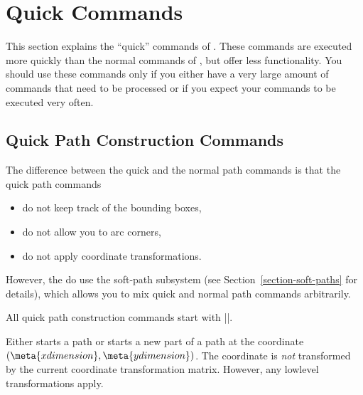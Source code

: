 %


\section{Quick Commands}

This section explains the ``quick'' commands of \pgfname. These
commands are executed more quickly than the normal commands of
\pgfname, but offer less functionality. You should use these commands
only if you either have a very large amount of commands that need to
be processed or if you expect your commands to be executed very often.



\subsection{Quick Path Construction Commands}

The difference between the quick and the normal path commands is that
the quick path commands
\begin{itemize}
\item
  do not keep track of the bounding boxes,
\item
  do not allow you to arc corners,
\item
  do not apply coordinate transformations.
\end{itemize}

However, the do use the soft-path subsystem (see
Section~\ref{section-soft-paths} for details), which allows you to mix
quick and normal path commands arbitrarily.

All quick path construction commands start with |\pgfpathq|.

\begin{command}{\pgfpathqmoveto{}}
  Either starts a path or starts a new part of a path at the coordinate
  $(\meta{x dimension},\meta{y dimension})$. The coordinate is
  \emph{not} transformed by the current coordinate transformation
  matrix. However, any lowlevel transformations apply.

\begin{codeexample}[]
\end{codeexample}
\end{command}

